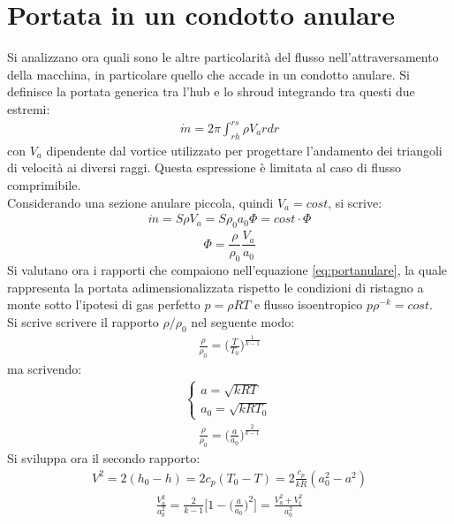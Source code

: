 \section{Portata in un condotto anulare}
Si analizzano ora quali sono le altre particolarità del flusso nell'attraversamento della macchina, in particolare quello che accade in un condotto anulare. Si definisce la portata generica tra l'hub e lo shroud integrando tra questi due estremi:
\begin{align*}
\dot{m} = 2 \pi \int_{rh}^{rs} \rho V_a r dr
\end{align*}
con $V_a$ dipendente dal vortice utilizzato per progettare l'andamento dei triangoli di velocità ai diversi raggi. Questa espressione è limitata al caso di flusso comprimibile.\\
Considerando una sezione anulare piccola, quindi $V_a = cost$, si scrive:
\begin{align*}
\dot{m} = S \rho V_a = S \rho_0 a_0 \Phi = cost \cdot \Phi
\end{align*}
\begin{equation}\label{eq:portanulare}
\Phi = \frac{\rho}{\rho_0} \frac{V_a}{a_0}
\end{equation}
Si valutano ora i rapporti che compaiono nell'equazione \ref{eq:portanulare}, la quale rappresenta la portata adimensionalizzata rispetto le condizioni di ristagno a monte sotto l'ipotesi di gas perfetto $p = \rho RT$ e flusso isoentropico $p \rho^{-k} = cost$.\\
Si scrive scrivere il rapporto $\rho/\rho_0$ nel seguente modo:
\begin{align*}
\frac{\rho}{\rho_0} = \bigg( \frac{T}{T_0} \bigg)^{\frac{1}{k-1}} 
\end{align*}
ma scrivendo:
\begin{align*}
\begin{cases}
a = \sqrt{kRT}\\
a_0 = \sqrt{kRT_0}
\end{cases}
\end{align*}
\begin{align*}
\frac{\rho}{\rho_0} = \bigg( \frac{a}{a_0} \bigg)^{\frac{2}{k-1}}
\end{align*}
Si sviluppa ora il secondo rapporto:
\begin{align*}
V^2 = 2 (h_0 - h) = 2 c_p (T_0 - T) = 2 \frac{c_p}{kR} (a_0^2 - a^2)
\end{align*}
\begin{align*}
\frac{V_a^2}{a_0^2} = \frac{2}{k-1} \bigg[ 1- \bigg( \frac{a}{a_0} \bigg)^2 \bigg] = \frac{V_a^2 + V_t^2}{a_0^2}
\end{align*}
